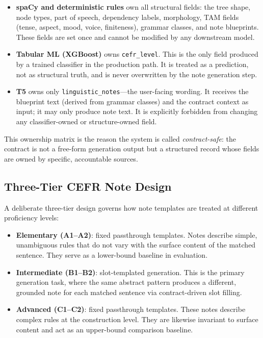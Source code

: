 \documentclass[12pt,a4paper,oneside]{report}
\begin{document}
\begin{itemize}
  \item \textbf{spaCy and deterministic rules} own all structural fields: the tree shape, node types, part of speech, dependency labels, morphology, TAM fields (tense, aspect, mood, voice, finiteness), grammar classes, and note blueprints. These fields are set once and cannot be modified by any downstream model.
  \item \textbf{Tabular ML (XGBoost)} owns \texttt{cefr\_level}. This is the only field produced by a trained classifier in the production path. It is treated as a prediction, not as structural truth, and is never overwritten by the note generation step.
  \item \textbf{T5} owns only \texttt{linguistic\_notes}---the user-facing wording. It receives the blueprint text (derived from grammar classes) and the contract context as input; it may only produce note text. It is explicitly forbidden from changing any classifier-owned or structure-owned field.
\end{itemize}

This ownership matrix is the reason the system is called \emph{contract-safe}: the contract is not a free-form generation output but a structured record whose fields are owned by specific, accountable sources.

\subsection*{Three-Tier CEFR Note Design}
A deliberate three-tier design governs how note templates are treated at different proficiency levels:

\begin{itemize}
  \item \textbf{Elementary (A1--A2)}: fixed passthrough templates. Notes describe simple, unambiguous rules that do not vary with the surface content of the matched sentence. They serve as a lower-bound baseline in evaluation.
  \item \textbf{Intermediate (B1--B2)}: slot-templated generation. This is the primary generation task, where the same abstract pattern produces a different, grounded note for each matched sentence via contract-driven slot filling.
  \item \textbf{Advanced (C1--C2)}: fixed passthrough templates. These notes describe complex rules at the construction level. They are likewise invariant to surface content and act as an upper-bound comparison baseline.
\end{itemize}
\end{document}
